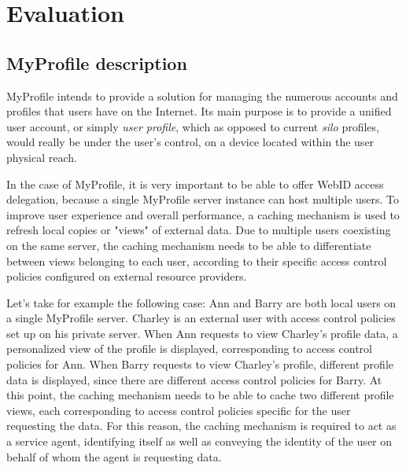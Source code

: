 \documentclass[a4paper]{llncs}
\begin{document}

\section{Evaluation}\label{sec:eval}

\subsection{MyProfile description}
MyProfile intends to provide a solution for managing the numerous accounts and profiles that users have on the Internet. Its main purpose is to provide a unified user account, or simply \textit{user profile}, which as opposed to current \textit{silo} profiles, would really be under the user's control, on a device located within the user physical reach.

In the case of MyProfile, it is very important to be able to offer WebID access delegation, because a single MyProfile server instance can host multiple users. To improve user experience and overall performance, a caching mechanism is used to refresh local copies or "views" of external data. Due to multiple users coexisting on the same server, the caching mechanism needs to be able to differentiate between views belonging to each user, according to their specific access control policies configured on external resource providers.

Let's take for example the following case: Ann and Barry are both local users on a single MyProfile server. Charley is an external user with access control policies set up on his private server. When Ann requests to view Charley's profile data, a personalized view of the profile is displayed, corresponding to access control policies for Ann. When Barry requests to view Charley's profile, different profile data is displayed, since there are different access control policies for Barry. At this point, the caching mechanism needs to be able to cache two different profile views, each corresponding to access control policies specific for the user requesting the data. For this reason, the caching mechanism is required to act as a service agent, identifying itself as well as conveying the identity of the user on  behalf of whom the agent is requesting data.
\end{document}
